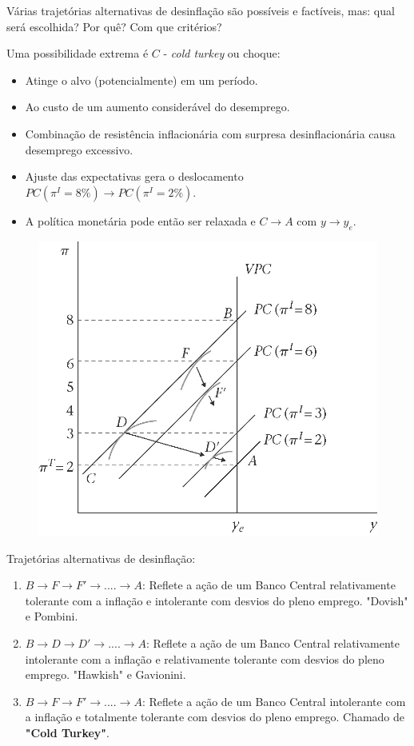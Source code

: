 \documentclass[a4paper,12pt]{article}[abntex2]
\begin{document}
Várias trajetórias alternativas de desinflação são possíveis e factíveis, mas: qual será escolhida? Por quê? Com que critérios?

Uma possibilidade extrema é \( C \) - \textit{cold turkey} ou choque:

\begin{itemize}
    \item Atinge o alvo (potencialmente) em um período.
    \item Ao custo de um aumento considerável do desemprego.
    \item Combinação de resistência inflacionária com surpresa desinflacionária causa desemprego excessivo.
    \item Ajuste das expectativas gera o deslocamento \( PC(\pi^I = 8\%) \rightarrow PC(\pi^I = 2\%) \).
    \item A política monetária pode então ser relaxada e \( C \rightarrow A \) com \( y \rightarrow y_e \).
\end{itemize}

\begin{figure}[H]
    \centering
    \includegraphics[width=0.7\linewidth]{Imagens/a10i5.png}
\end{figure}

Trajetórias alternativas de desinflação:\begin{enumerate}
    \item \(B\rightarrow F \rightarrow F'\rightarrow ....\rightarrow A\): Reflete a ação de um Banco Central relativamente tolerante com a inflação e intolerante com desvios do pleno emprego. "Dovish" e Pombini.
    \item \(B\rightarrow D \rightarrow D'\rightarrow ....\rightarrow A\): Reflete a ação de um Banco Central relativamente intolerante com a inflação e relativamente tolerante com desvios do pleno emprego. "Hawkish" e Gavionini.
    \item \(B\rightarrow F \rightarrow F'\rightarrow ....\rightarrow A\): Reflete a ação de um Banco Central  intolerante com a inflação e totalmente tolerante com desvios do pleno emprego. Chamado de \textbf{"Cold Turkey"}.
\end{enumerate}
\end{document}
